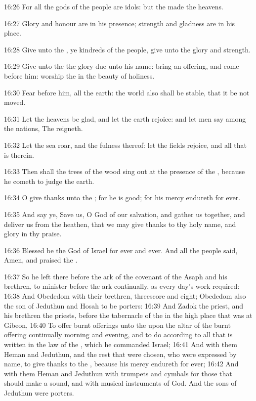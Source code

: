 16:26 For all the gods of the people are idols: but the \LORD made the heavens.

16:27 Glory and honour are in his presence; strength and gladness are in his place.

16:28 Give unto the \LORD, ye kindreds of the people, give unto the \LORD glory and strength.

16:29 Give unto the \LORD the glory due unto his name: bring an offering, and come before him: worship the \LORD in the beauty of holiness.

16:30 Fear before him, all the earth: the world also shall be stable, that it be not moved.

16:31 Let the heavens be glad, and let the earth rejoice: and let men say among the nations, The \LORD reigneth.

16:32 Let the sea roar, and the fulness thereof: let the fields rejoice, and all that is therein.

16:33 Then shall the trees of the wood sing out at the presence of the \LORD, because he cometh to judge the earth.

16:34 O give thanks unto the \LORD; for he is good; for his mercy endureth for ever.

16:35 And say ye, Save us, O God of our salvation, and gather us together, and deliver us from the heathen, that we may give thanks to thy holy name, and glory in thy praise.

16:36 Blessed be the \LORD God of Israel for ever and ever. And all the people said, Amen, and praised the \LORD.

16:37 So he left there before the ark of the covenant of the \LORD Asaph and his brethren, to minister before the ark continually, as every day's work required: 16:38 And Obededom with their brethren, threescore and eight; Obededom also the son of Jeduthun and Hosah to be porters: 16:39 And Zadok the priest, and his brethren the priests, before the tabernacle of the \LORD in the high place that was at Gibeon, 16:40 To offer burnt offerings unto the \LORD upon the altar of the burnt offering continually morning and evening, and to do according to all that is written in the law of the \LORD, which he commanded Israel; 16:41 And with them Heman and Jeduthun, and the rest that were chosen, who were expressed by name, to give thanks to the \LORD, because his mercy endureth for ever; 16:42 And with them Heman and Jeduthun with trumpets and cymbals for those that should make a sound, and with musical instruments of God. And the sons of Jeduthun were porters.

